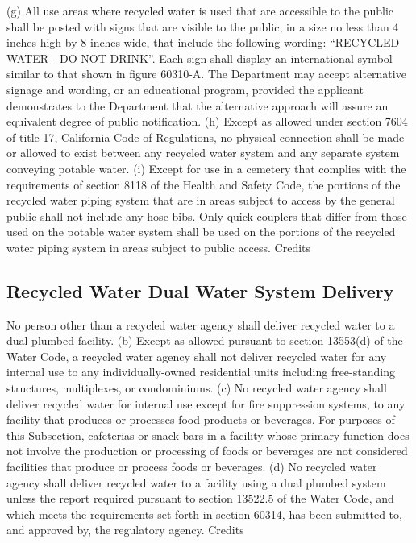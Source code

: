 (g) All use areas where recycled water is used that are accessible to the public shall be posted with signs that are visible to the public, in a size no less than 4 inches high by 8 inches wide, that include the following wording: “RECYCLED WATER - DO NOT DRINK”. Each sign shall display an international symbol similar to that shown in figure 60310-A. The Department may accept alternative signage and wording, or an educational program, provided the applicant demonstrates to the Department that the alternative approach will assure an equivalent degree of public notification.
(h) Except as allowed under section 7604 of title 17, California Code of Regulations, no physical connection shall be made or allowed to exist between any recycled water system and any separate system conveying potable water.
(i) Except for use in a cemetery that complies with the requirements of section 8118 of the Health and Safety Code, the portions of the recycled water piping system that are in areas subject to access by the general public shall not include any hose bibs. Only quick couplers that differ from those used on the potable water system shall be used on the portions of the recycled water piping system in areas subject to public access.
Credits

\subsection{Recycled Water Dual Water System Delivery} 
No person other than a recycled water agency shall deliver recycled water to a dual-plumbed facility.
(b) Except as allowed pursuant to section 13553(d) of the Water Code, a recycled water agency shall not deliver recycled water for any internal use to any individually-owned residential units including free-standing structures, multiplexes, or condominiums.
(c) No recycled water agency shall deliver recycled water for internal use except for fire suppression systems, to any facility that produces or processes food products or beverages. For purposes of this Subsection, cafeterias or snack bars in a facility whose primary function does not involve the production or processing of foods or beverages are not considered facilities that produce or process foods or beverages.
(d) No recycled water agency shall deliver recycled water to a facility using a dual plumbed system unless the report required pursuant to section 13522.5 of the Water Code, and which meets the requirements set forth in section 60314, has been submitted to, and approved by, the regulatory agency.
Credits


